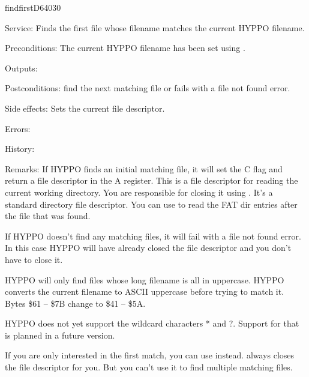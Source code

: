 %
\newpage
\begin{hyppotrap}{findfirst}{D640}{30}
\item [Service:]
  Finds the first file whose filename matches the current HYPPO filename.
\item [Preconditions:]
  The current HYPPO filename has been set using .
\item [Outputs:]
\item [Postconditions:]
   find the next matching file or fails with a file not
  found error.
\item [Side effects:]
  Sets the current file descriptor.
\item [Errors:]
\item [History:]
\item [Remarks:]
  If HYPPO finds an initial matching file, it will set the C flag and
  return a file descriptor in the A register. This is a file descriptor for
  reading the current working directory. You are responsible for closing it
  using . It's a standard directory file descriptor. You
  can use  to read the FAT dir entries after the file that
  was found.

  If HYPPO doesn't find any matching files, it will fail with a file
  not found error. In this case HYPPO will have already closed the
  file descriptor and you don't have to close it.

  HYPPO will only find files whose long filename is all in uppercase.
  HYPPO converts the current filename to ASCII uppercase before trying
  to match it. Bytes \$61 -- \$7B change to \$41 -- \$5A.

  HYPPO does not yet support the wildcard characters * and ?. Support
  for that is planned in a future version.

  If you are only interested in the first match, you can use 
  instead.  always closes the file descriptor for you. But
  you can't use it to find multiple matching files.
\end{hyppotrap}


